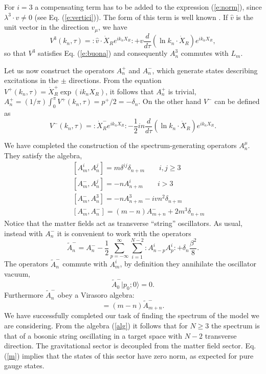 \documentclass[a4paper,aps,prd,twocolumn,groupedaddress]{revtex4}
\begin{document}
For $i=3$ a compensating term has to be added to the expression
(\ref{e:norm}), since $\lambda^3\cdot v\ne0$ (see
Eq. (\ref{e:vertici})). The form of this term is well known \cite{br}. If
$\hat{v}$ is the unit vector in the direction $v_\mu$, we have
\begin{displaymath}
V^3(k_n,\tau) = :\hat{v}\cdot\dot{X}_R e^{ik_nX_R}: +
v\frac{d}{d\tau}(\ln k_n\cdot \dot{X}_R)e^{ik_nX_R},
\end{displaymath}
so that $V^3$ satisfies Eq. (\ref{e:buona}) and consequently 
$A^3_n$
commutes with $L_m$. 

Let us now construct the operators $A^+_n$ and $A_n^-$, which generate
states describing excitations in the ${\pm}$ directions. From the
equation $V^+(k_n,\tau)=\dot{X}_R^+\exp(ik_n X_R)$, it follows that
$A^+_n$ is trivial, $A^+_n = (1/\pi)\int_0^\pi
V^+(k_n,\tau)=p^+/2=-\delta_n$.  On the other hand $V^-$ can be defined
as
\begin{displaymath}
V^-(k_n,\tau) = :\dot{X}^-_R e^{ik_nX_R}: -\frac{1}{2}i n
\frac{d}{d\tau}(\ln k_n\cdot \dot{X}_R)e^{ik_nX_R}.
\end{displaymath}

We have completed the construction of the spectrum-generating 
operators $A^\mu_n$. They satisfy the  algebra,
\begin{eqnarray}\label{alg}
&&[A^i_m,A^j_n] = m\delta^{ij}\delta_{n+m} \qquad i,j\ge 3\nonumber
\\
&&[A^-_m,A^j_n] = -nA^i_{n+m} \qquad i > 3  \nonumber\\
&&[A^-_m,A^3_n] = -nA^3_{n+m} -ivn^2\delta_{n+m} \nonumber \\
&&[A^-_m,A^-_n] = (m-n)A^-_{m+n} +2m^3\delta_{n+m}
\end{eqnarray}
Notice that the matter fields act as transverse ``string'' oscillators. 
As usual, instead with
$A^-_n$ it is convenient to work with the operators
\begin{displaymath}
\tilde A^-_n = A^-_n
-\frac{1}{2}\sum_{p=-\infty}^{\infty}\sum_{i=1}^{N-2}:A^i_{n-p}A^i_{p}:
+\delta_n\frac{\beta^2}{8}.
\end{displaymath}
The operators $\tilde A^-_n$ commute with $A^i_m$, by definition they 
annihilate the oscillator vacuum,
\begin{equation}\label{m}
\tilde A^-_0|p_0;0\rangle =0.
\end{equation}
Furthermore $\tilde A_n^-$ obey a Virasoro
algebra:
\begin{displaymath}
[\tilde A^-_m, \tilde A^-_n] = (m-n)\tilde A^-_{m+n}.
\end{displaymath}
We have successfully completed our task of finding the spectrum of 
the model we are considering. From the algebra (\ref{alg}) it follows 
that for $N\ge3$ the spectrum is that of a bosonic string oscillating 
in a target space with  $N-2$ transverse direction.
The gravitational sector is decoupled 
from the matter field sector.  Eq. (\ref{m}) implies  that the 
states of this sector have zero norm, as expected for   
pure gauge states.
\end{document}
